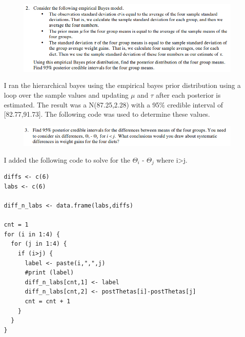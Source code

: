 \documentclass[12pt]{article}
\begin{document}
\begin{figure}[H]
\begin{flushleft}
\includegraphics[scale=.9]{HW8Q2.png}
\end{flushleft}
\end{figure}
I ran the hierarchical bayes using the empirical bayes prior distribution using a loop over the sample values and updating $\mu$ and $\tau$ after each posterior is estimated.  The result was a N(87.25,2.28) with a 95\% credible interval of [82.77,91.73].  The following code was used to determine these values.



\begin{figure}[H]
\begin{flushleft}
\includegraphics[scale=.9]{HW8Q3.png}
\end{flushleft}
\end{figure}
I added the following code to solve for the $\Theta_i$ - $\Theta_j$ where i>j.
\begin{verbatim}
diffs <- c(6)
labs <- c(6)

diff_n_labs <- data.frame(labs,diffs)

cnt = 1
for (i in 1:4) {
  for (j in 1:4) {
    if (i>j) {
      label <- paste(i,",",j)
      #print (label)
      diff_n_labs[cnt,1] <- label
      diff_n_labs[cnt,2] <- postThetas[i]-postThetas[j]
      cnt = cnt + 1
    }
  }
}
\end{verbatim}
\end{document}
